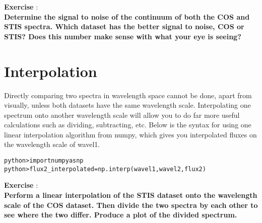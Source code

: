 {\bf \color{blue} Exercise  }:  \\
{\bf Determine the signal to noise of the continuum of both the COS and STIS spectra. Which dataset has the better signal to noise, COS or STIS? Does this number make sense with what your eye is seeing?} 

\section{Interpolation}
Directly comparing two spectra in wavelength space cannot be done, apart from visually, unless both datasets have the same wavelength scale.  Interpolating one spectrum onto another wavelength scale will allow you to do far more useful calculations such as dividing, subtracting, etc. Below is the syntax for using one linear interpolation algorithm from numpy, which gives you interpolated fluxes on the wavelength scale of wavel1.
\begin{alltt}
python> import numpy as np
python> flux2_interpolated = np.interp(wavel1, wavel2, flux2)
\end{alltt}

{\bf \color{blue} Exercise  }:  \\
{\bf Perform a linear interpolation of the STIS dataset onto the wavelength scale of the COS dataset.  Then divide the two spectra by each other to see where the two differ. Produce a plot of the divided spectrum.} 



